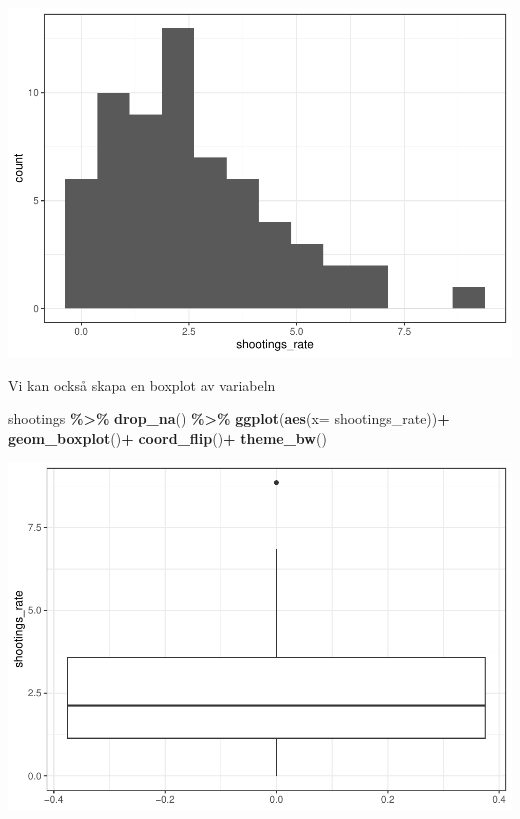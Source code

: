 \documentclass[
]{book}
\newenvironment{Shaded}{\begin{snugshade}}{\end{snugshade}}
\newcommand{\AttributeTok}[1]{\textcolor[rgb]{0.13,0.29,0.53}{#1}}
\newcommand{\FunctionTok}[1]{\textcolor[rgb]{0.13,0.29,0.53}{\textbf{#1}}}
\newcommand{\NormalTok}[1]{#1}
\newcommand{\SpecialCharTok}[1]{\textcolor[rgb]{0.81,0.36,0.00}{\textbf{#1}}}
\begin{document}
\includegraphics{_main_files/figure-latex/unnamed-chunk-13-1.pdf}

Vi kan också skapa en boxplot av variabeln

\begin{Shaded}
\begin{Highlighting}[]
\NormalTok{shootings }\SpecialCharTok{\%\textgreater{}\%} \FunctionTok{drop\_na}\NormalTok{() }\SpecialCharTok{\%\textgreater{}\%} 
  \FunctionTok{ggplot}\NormalTok{(}\FunctionTok{aes}\NormalTok{(}\AttributeTok{x=}\NormalTok{ shootings\_rate))}\SpecialCharTok{+} \FunctionTok{geom\_boxplot}\NormalTok{()}\SpecialCharTok{+} \FunctionTok{coord\_flip}\NormalTok{()}\SpecialCharTok{+} \FunctionTok{theme\_bw}\NormalTok{()}
\end{Highlighting}
\end{Shaded}

\includegraphics{_main_files/figure-latex/unnamed-chunk-14-1.pdf}
\end{document}
